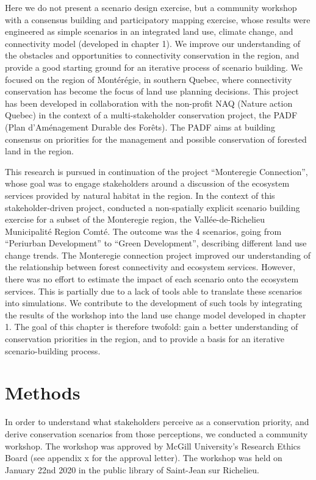 Here we do not present a scenario design exercise, but a community workshop with a consensus building and participatory mapping exercise, whose results were engineered as simple scenarios in an integrated land use, climate change, and connectivity model (developed in chapter 1). We improve our understanding of the obstacles and opportunities to connectivity conservation in the region, and provide a good starting ground for an iterative process of scenario building. We focused on the region of Montérégie, in southern Quebec, where connectivity conservation has become the focus of land use planning decisions. This project has been developed in collaboration with the non-profit NAQ (Nature action Quebec) in the context of a multi-stakeholder conservation project, the PADF (Plan d’Aménagement Durable des Forêts). The PADF aims at building consensus on priorities for the management and possible conservation of forested land in the region.

This research is pursued in continuation of the project “Monteregie Connection”, whose goal was to engage stakeholders around a discussion of the ecosystem services provided by natural habitat in the region. In the context of this stakeholder-driven project, \cite{mitchell_monteregie_2015} conducted a non-spatially explicit scenario building exercise for a subset of the Monteregie region, the Vallée-de-Richelieu Municipalité Region Comté. The outcome was the 4 scenarios, going from “Periurban Development” to “Green Development”, describing different land use change trends. The Monteregie connection project improved our understanding of the relationship between forest connectivity and ecosystem services. However, there was no effort to estimate the impact of each scenario onto the ecosystem services. This is partially due to a lack of tools able to translate these scenarios into simulations. We contribute to the development of such tools by integrating the results of the workshop into the land use change model developed in chapter 1. The goal of this chapter is therefore twofold: gain a better understanding of conservation priorities in the region, and to provide a basis for an iterative scenario-building process. 
\\

\section{Methods}

In order to understand what stakeholders perceive as a conservation priority, and derive conservation scenarios from those perceptions, we conducted a community workshop. The workshop was approved by McGill University’s Research Ethics Board (see appendix {x} for the approval letter). The workshop was held on January 22nd 2020 in the public library of Saint-Jean sur Richelieu. \\

